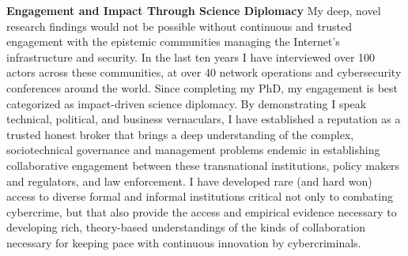 \documentclass[11pt]{letter}
\begin{document}
\begin{letter}
\textbf{Engagement and Impact Through Science Diplomacy} \vspace{0.2 \baselineskip} \newline %
%
My deep, novel research findings would not be possible without continuous and trusted engagement with the epistemic communities managing the Internet's infrastructure and security.
%
In the last ten years I have interviewed over 100 actors across these communities, at over 40 network operations and cybersecurity conferences around the world.
%
%
%
%
Since completing my PhD, my engagement is best categorized as impact-driven science diplomacy.
%
By demonstrating I speak technical, political, and business vernaculars, I have established a reputation as a trusted honest broker that brings a deep understanding of the complex, sociotechnical governance and management problems endemic in establishing collaborative engagement between these transnational institutions, policy makers and regulators, and law enforcement.
%
I have developed rare (and hard won) access to diverse formal and informal institutions critical not only to combating cybercrime, but that also provide the access and empirical evidence necessary to developing rich, theory-based understandings of the kinds of collaboration necessary for keeping pace with continuous innovation by cybercriminals.
%



\end{letter}
\end{document}
